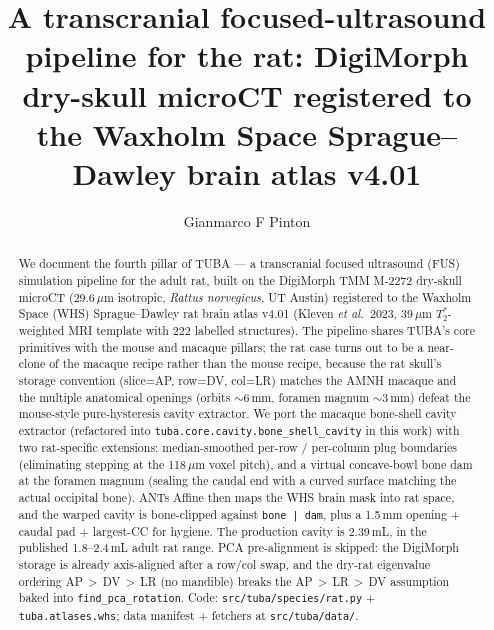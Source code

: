 \documentclass{compactarticle}
\begin{document}
\justifying
{}


\title{A transcranial focused-ultrasound pipeline for the rat:
       DigiMorph dry-skull microCT registered to the Waxholm Space
       Sprague--Dawley brain atlas v4.01}

\author{Gianmarco F Pinton}




\begin{abstract}
We document the fourth pillar of TUBA --- a transcranial focused
ultrasound (FUS) simulation pipeline for the adult rat, built on the
DigiMorph TMM M-2272 dry-skull microCT (29.6\,$\mu$m isotropic,
\emph{Rattus norvegicus}, UT Austin) registered to the Waxholm Space
(WHS) Sprague--Dawley rat brain atlas v4.01 (Kleven \emph{et al.}\
2023, 39\,$\mu$m $T_2^*$-weighted MRI template with 222 labelled
structures). The pipeline shares TUBA's core primitives with the
mouse and macaque pillars; the rat case turns out to be a near-clone
of the macaque recipe rather than the mouse recipe, because the rat
skull's storage convention (slice=AP, row=DV, col=LR) matches the
AMNH macaque and the multiple anatomical openings (orbits ${\sim}6$\,mm,
foramen magnum ${\sim}3$\,mm) defeat the mouse-style pure-hysteresis
cavity extractor. We port the macaque bone-shell cavity
extractor (refactored into
\texttt{tuba.core.cavity.bone\_shell\_cavity} in this work) with two
rat-specific extensions: median-smoothed per-row / per-column plug
boundaries (eliminating stepping at the 118\,$\mu$m voxel pitch),
and a virtual concave-bowl bone dam at the foramen magnum (sealing
the caudal end with a curved surface matching the actual occipital
bone). ANTs Affine then maps the WHS brain mask into rat space, and
the warped cavity is bone-clipped against \texttt{bone | dam}, plus
a 1.5\,mm opening + caudal pad + largest-CC for hygiene. The
production cavity is 2.39\,mL, in the published 1.8--2.4\,mL adult
rat range. PCA pre-alignment is skipped: the
DigiMorph storage is already axis-aligned after a row/col swap, and
the dry-rat eigenvalue ordering AP\,$>$\,DV\,$>$\,LR (no mandible)
breaks the AP\,$>$\,LR\,$>$\,DV assumption baked into
\texttt{find\_pca\_rotation}. Code: \texttt{src/tuba/species/rat.py}
+ \texttt{tuba.\allowbreak atlases.\allowbreak whs}; data manifest +
fetchers at \texttt{src/tuba/data/}.
\end{abstract}
\end{document}
